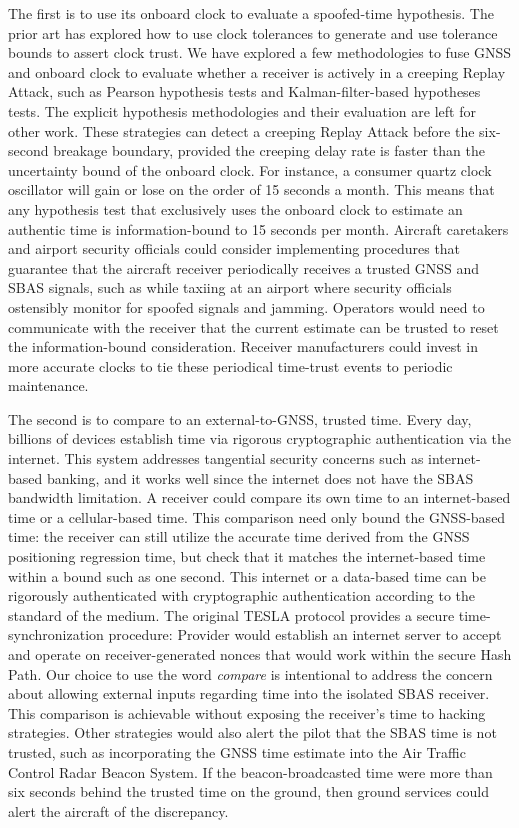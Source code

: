\documentclass[APA,STIX1COL]{IONjournal/ION-APA Template}
\begin{document}
	The first is to use its onboard clock to evaluate a spoofed-time hypothesis.
	The prior art has explored how to use clock tolerances to generate and use tolerance bounds to assert clock trust\cite{time_sync_paper}.
	We have explored a few methodologies to fuse GNSS and onboard clock to evaluate whether a receiver is actively in a creeping Replay Attack, such as Pearson hypothesis tests and Kalman-filter-based hypotheses tests.
	The explicit hypothesis methodologies and their evaluation are left for other work.
	These strategies can detect a creeping Replay Attack before the six-second breakage boundary, provided the creeping delay rate is faster than the uncertainty bound of the onboard clock.
	For instance, a consumer quartz clock oscillator will gain or lose on the order of 15 seconds a month.
	This means that any hypothesis test that exclusively uses the onboard clock to estimate an authentic time is information-bound to 15 seconds per month.
	Aircraft caretakers and airport security officials could consider implementing procedures that guarantee that the aircraft receiver periodically receives a trusted GNSS and SBAS signals, such as while taxiing at an airport where security officials ostensibly monitor for spoofed signals and jamming.
	Operators would need to communicate with the receiver that the current estimate can be trusted to reset the information-bound consideration.
	Receiver manufacturers could invest in more accurate clocks to tie these periodical time-trust events to periodic maintenance.

	The second is to compare to an external-to-GNSS, trusted time.
	Every day, billions of devices establish time via rigorous cryptographic authentication via the internet.
	This system addresses tangential security concerns such as internet-based banking, and it works well since the internet does not have the SBAS bandwidth limitation.
	A receiver could compare its own time to an internet-based time or a cellular-based time.
	This comparison need only bound the GNSS-based time: the receiver can still utilize the accurate time derived from the GNSS positioning regression time, but check that it matches the internet-based time within a bound such as one second.
	This internet or a data-based time can be rigorously authenticated with cryptographic authentication according to the standard of the medium.
	The original TESLA protocol provides a secure time-synchronization procedure: Provider would establish an internet server to accept and operate on receiver-generated nonces that would work within the secure Hash Path\cite{perrig2005timed}.
	Our choice to use the word {\em compare} is intentional to address the concern about allowing external inputs regarding time into the isolated SBAS receiver.
	This comparison is achievable without exposing the receiver's time to hacking strategies.
	Other strategies would also alert the pilot that the SBAS time is not trusted, such as incorporating the GNSS time estimate into the Air Traffic Control Radar Beacon System.
	If the beacon-broadcasted time were more than six seconds behind the trusted time on the ground, then ground services could alert the aircraft of the discrepancy.
\end{document}
